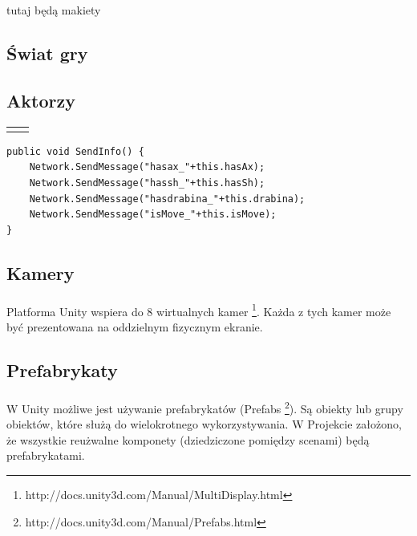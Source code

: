 \documentclass[12pt]{article}
\begin{document}
{{{\color{red}tutaj będą makiety}

\subsection{Świat gry}
\subsection{Aktorzy}

\begin{center}

 \begin{tabular}{|c|c|}
 \hline  
  &   \\
  \hline   
  &   \\
  \hline   
\end{tabular}
\end{center}

\begin{lstlisting}[language=CSharp]
public void SendInfo() {
	Network.SendMessage("hasax_"+this.hasAx);
	Network.SendMessage("hassh_"+this.hasSh);
	Network.SendMessage("hasdrabina_"+this.drabina);
	Network.SendMessage("isMove_"+this.isMove);
}
\end{lstlisting}

\subsection{Kamery}
\paragraph{}
Platforma Unity wspiera do 8 wirtualnych kamer \footnote{http://docs.unity3d.com/Manual/MultiDisplay.html}.
Każda z tych kamer może być prezentowana na oddzielnym fizycznym ekranie.

\subsection{Prefabrykaty}
\paragraph{}
W Unity możliwe jest używanie prefabrykatów (Prefabs \footnote{http://docs.unity3d.com/Manual/Prefabs.html}). Są obiekty lub grupy obiektów, które służą do wielokrotnego wykorzystywania. W Projekcie założono, że wszystkie reużwalne komponety (dziedziczone pomiędzy scenami) będą prefabrykatami.

}}
\end{document}
